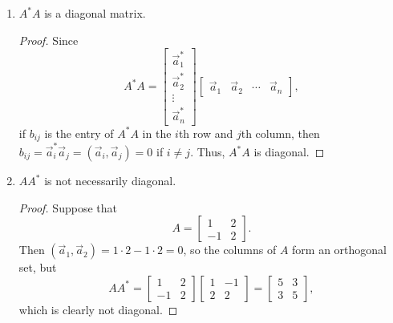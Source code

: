 \documentclass{homework}
\begin{document}
	\begin{enumerate}
		\item $A^*A$ is a diagonal matrix.
		\begin{proof}
			Since
			\begin{equation*}
				A^*A = \left[\begin{matrix}
					\vec{a}_1^* \\ \vec{a}_2^* \\ \vdots \\ \vec{a}_n^*
				\end{matrix}\right]
				\left[\begin{matrix}
					\vec{a}_1 & \vec{a}_2 & \cdots & \vec{a}_n
				\end{matrix}\right],
			\end{equation*}
			if $b_{ij}$ is the entry of $A^*A$ in the $i$th row and $j$th column, then $b_{ij} = \vec{a}_i^*\vec{a}_j = (\vec{a}_i, \vec{a}_j) = 0$ if $i \ne j$. Thus, $A^*A$ is diagonal.
		\end{proof}
		
		\item $AA^*$ is not necessarily diagonal.
		\begin{proof}
			Suppose that
			\begin{equation*}
				A = \left[\begin{matrix}
					1 & 2 \\
					-1 & 2
				\end{matrix}\right].
			\end{equation*}
			Then $(\vec{a}_1, \vec{a}_2) = 1\cdot 2 - 1\cdot2 = 0$, so the columns of $A$ form an orthogonal set, but
			\begin{equation*}
				AA^* = \left[\begin{matrix}
					1 & 2 \\
					-1 & 2
				\end{matrix}\right]
				\left[\begin{matrix}
					1 & - 1\\
					2 & 2
				\end{matrix}\right] 
				= \left[\begin{matrix}
					5 & 3 \\
					3 & 5
				\end{matrix}\right],
			\end{equation*}
			which is clearly not diagonal.
		\end{proof}
	\end{enumerate}
	
	\question 
	
	\question
\end{document}
